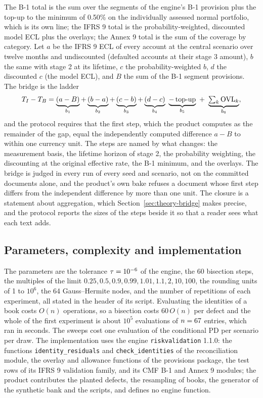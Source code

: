 The B-1 total is the sum over the segments of the engine's B-1 provision plus the top-up to the minimum of 0.50\% on the individually assessed normal portfolio, which is its own line; the IFRS 9 total is the probability-weighted, discounted model ECL plus the overlays; the Annex 9 total is the sum of the coverage by category.
Let $a$ be the IFRS 9 ECL of every account at the central scenario over twelve months and undiscounted (defaulted accounts at their stage 3 amount), $b$ the same with stage 2 at its lifetime, $c$ the probability-weighted $b$, $d$ the discounted $c$ (the model ECL), and $B$ the sum of the B-1 segment provisions.
The bridge is the ladder
\begin{equation}
T_I-T_B=\underbrace{(a-B)}_{b_1}+\underbrace{(b-a)}_{b_2}+\underbrace{(c-b)}_{b_3}+\underbrace{(d-c)}_{b_4}\ \underbrace{-\,\text{top-up}}_{b_5}\ +\ \underbrace{\textstyle\sum_k\OVL_k}_{b_6},
\label{eq:bridge}
\end{equation}
and the protocol requires that the first step, which the product computes as the remainder of the gap, equal the independently computed difference $a-B$ to within one currency unit.
The steps are named by what changes: the measurement basis, the lifetime horizon of stage 2, the probability weighting, the discounting at the original effective rate, the B-1 minimum, and the overlays.
The bridge is judged in every run of every seed and scenario, not on the committed documents alone, and the product's own bake refuses a document whose first step differs from the independent difference by more than one unit.
The closure is a statement about aggregation, which Section~\ref{sec:theory-bridge} makes precise, and the protocol reports the sizes of the steps beside it so that a reader sees what each text adds.

\subsection{Parameters, complexity and implementation}
\label{sec:method-implementation}

The parameters are the tolerance $\tau=10^{-6}$ of the engine, the 60 bisection steps, the multiples of the limit $0.25,0.5,0.9,0.99,1.01,1.1,2,10,100$, the rounding units of 1 to $10^{6}$, the 64 Gauss--Hermite nodes, and the number of repetitions of each experiment, all stated in the header of its script.
Evaluating the identities of a book costs $O(n)$ operations, so a bisection costs $60\,O(n)$ per defect and the whole of the first experiment is about $10^{5}$ evaluations of $n=67{}$ entries, which ran in \eoneSeconds{} seconds.
The sweeps cost one evaluation of the conditional PD per scenario per draw.
The implementation uses the engine \texttt{riskvalidation} 1.1.0: the functions \texttt{identity\_residuals} and \texttt{check\_identities} of the reconciliation module, the overlay and allowance functions of the provisions package, the test rows of its IFRS 9 validation family, and its CMF B-1 and Annex 9 modules; the product contributes the planted defects, the resampling of books, the generator of the synthetic bank and the scripts, and defines no engine function.
